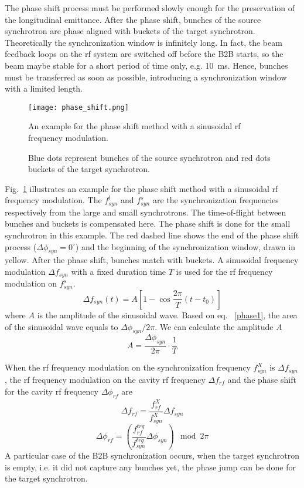 The phase shift process must be performed slowly enough for the preservation of the longitudinal emittance. After the phase shift, bunches of the source synchrotron are phase aligned with buckets of the target synchrotron. Theoretically the synchronization window is infinitely long. In fact, the beam feedback loops on the rf system are switched off before the B2B starts, so the beam maybe stable for a short period of time only, e.g. \SI{10}{ms}. Hence, bunches must be transferred as soon as possible, introducing a synchronization window with a limited length.
\begin{figure}[!htb]
   \centering   
   \texttt{[image: phase\_shift.png]}
   \caption{An example for the phase shift method with a sinusoidal rf frequency modulation.}
	\caption*{Blue dots represent bunches of the source synchrotron and red dots buckets of the target synchrotron.}
   \label{phase_shift}
\end{figure}


Fig.~\ref{phase_shift} illustrates an example for the phase shift method with a sinusoidal rf frequency modulation. The $f_{\mathit{syn}}^{l}$ and $f_{\mathit{syn}}^{s}$ are the synchronization frequencies respectively from the large and small synchrotrons. The time-of-flight between bunches and buckets is compensated here. The phase shift is done for the small synchrotron in this example. The red dashed line shows the end of the phase shift process ($\Delta \phi_\mathit{syn}=0^\circ$) and the beginning of the synchronization window, drawn in yellow. After the phase shift, bunches match with buckets. A sinusoidal frequency modulation $\Delta f_{\mathit{syn}}$ with a fixed duration time $T$ is used for the rf frequency modulation on $f_{\mathit{syn}}^{s}$.
\begin{equation}
\Delta f_{\mathit{syn}}(t)=A[1-\cos \frac{2\pi}{T}(t-t_0)]
\end{equation}
where $A$ is the amplitude of the sinusoidal wave. Based on eq. ~\ref{phase1}, the area of the sinusoidal wave equals to $\Delta \phi_\mathit{syn}/2\pi$. We can calculate the amplitude $A$  
\begin{equation}
A= \frac{\Delta \phi_\mathit{syn}}{2\pi}\cdot\frac{1}{T}
\end{equation}

When the rf frequency modulation on the synchronization frequency $f_{\mathit{syn}}^{X}$ is $\Delta f_{\mathit{syn}}$, the rf frequency modulation on the cavity rf frequency $\Delta f_{\mathit{rf}}$ and the phase shift for the cavity rf frequency $\Delta \phi_\mathit{rf}$ are
\begin{equation}
\Delta f_{\mathit{rf}}=\frac{f_\mathit{rf}^\mathit{X}}{f_\mathit{syn}^\mathit{X}}\Delta f_{\mathit{syn}}
\end{equation}
\begin{equation}
\Delta \phi_\mathit{rf}=(\frac{f_\mathit{rf}^\mathit{trg}}{f_\mathit{syn}^\mathit{trg}}\Delta\phi_\mathit{syn}) \mod 2\pi
\end{equation} 
A particular case of the B2B synchronization occurs, when the target synchrotron is empty, i.e. it did not capture any bunches yet, the phase jump can be done for the target synchrotron.

